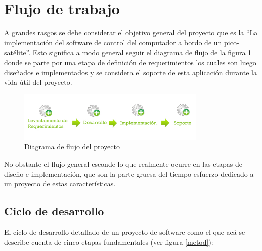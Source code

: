 \documentclass[11pt,letterpaper]{article}
\begin{document}
\newpage
\section{Flujo de trabajo}

A grandes rasgos se debe considerar el objetivo general del proyecto que es la ``La implementación del software de control del computador a bordo de un pico-satélite''. Esto significa a modo general seguir el diagrama de flujo de la figura \ref{flujo} donde se parte por una etapa de definición de requerimientos los cuales son luego diseñados e implementados y se considera el soporte de esta aplicación durante la vida útil del proyecto.

\begin{figure}[!hb]
\centering
\includegraphics[width=0.8\textwidth]{img/flujo_desarrollo.jpg}
\caption{Diagrama de flujo del proyecto} \label{flujo}
\end{figure}

No obstante el flujo general esconde lo que realmente ocurre en las etapas de diseño e implementación, que son la parte gruesa del tiempo  esfuerzo dedicado a un proyecto de estas características.

\subsection{Ciclo de desarrollo}

El ciclo de desarrollo detallado de un proyecto de software como el que acá se describe cuenta de cinco etapas fundamentales (ver figura \ref{metod}):
\end{document}
